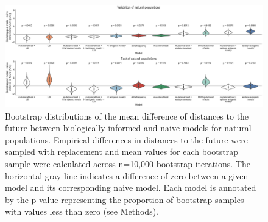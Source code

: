 \begin{figure}[H]
  \begin{center}
  \includegraphics[width=\textwidth]{figures/bootstrap_distributions_for_natural_sample_1_with_90_vpm_sliding.pdf}
  \caption{
  Bootstrap distributions of the mean difference of distances to the future between biologically-informed and naive models for natural populations.
  Empirical differences in distances to the future were sampled with replacement and mean values for each bootstrap sample were calculated across n=10,000 bootstrap iterations.
  The horizontal gray line indicates a difference of zero between a given model and its corresponding naive model.
  Each model is annotated by the p-value representing the proportion of bootstrap samples with values less than zero (see Methods).
  }
  \label{sup_fig:bootstrap_distributions_for_natural_sample_1_with_90_vpm_sliding}
  \end{center}
\end{figure}

